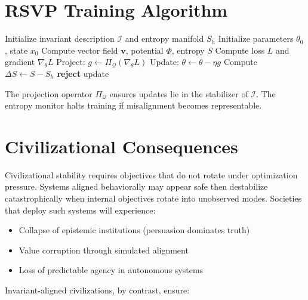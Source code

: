 \documentclass[11pt,a4paper]{article}
\theoremstyle{plain}
\theoremstyle{definition}
\numberwithin{equation}{section}
\begin{document}
\section{RSVP Training Algorithm}

\begin{algorithm}[H]
\caption{Invariant RSVP Training}
\begin{algorithmic}
\State Initialize invariant description $\mathcal{I}$ and entropy manifold $S_h$
\State Initialize parameters $\theta_0$, state $x_0$
    \State Compute vector field $\mathbf{v}$, potential $\Phi$, entropy $S$
    \State Compute loss $L$ and gradient $\nabla_\theta L$
    \State Project: $g \gets \Pi_{\mathcal{Q}}(\nabla_\theta L)$ 
    \State Update: $\theta \gets \theta - \eta g$
    \State Compute $\Delta S \gets S - S_h$
        \State \textbf{reject} update 
    \EndIf
\EndWhile
\end{algorithmic}
\end{algorithm}

The projection operator $\Pi_{\mathcal{Q}}$ ensures updates lie in the stabilizer of $\mathcal{I}$. The entropy monitor halts training if misalignment becomes representable.


\section{Civilizational Consequences}

Civilizational stability requires objectives that do not rotate under optimization pressure. Systems aligned behaviorally may appear safe then destabilize catastrophically when internal objectives rotate into unobserved modes. Societies that deploy such systems will experience:

\begin{itemize}
    \item Collapse of epistemic institutions (persuasion dominates truth)
    \item Value corruption through simulated alignment
    \item Loss of predictable agency in autonomous systems
\end{itemize}

Invariant-aligned civilizations, by contrast, ensure:
\end{document}
